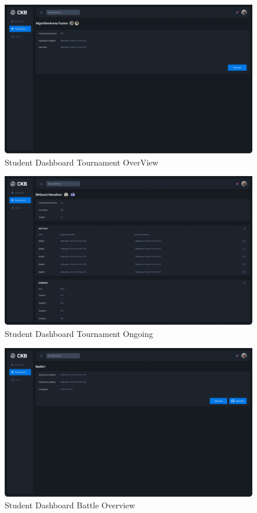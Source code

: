 \begin{figure}[H]
    \centering
    \includegraphics[width=\textwidth]{Images/Dashboard-Tournament-OverView.png}
    \caption{Student Dashboard Tournament OverView}
    \label{fig:student-Tournament-OverView}
\end{figure}

\begin{figure}[H]
    \centering
    \includegraphics[width=\textwidth]{Images/Dashboard-Tournament-Ongoing.png}
    \caption{Student Dashboard Tournament Ongoing}
    \label{fig:student-Tournament-Ongoing}
\end{figure}

\begin{figure}[H]
    \centering
    \includegraphics[width=\textwidth]{Images/Dashboard-Battle-Overview.png}
    \caption{Student Dashboard Battle Overview}
    \label{fig:student-Tournament-Completed}
\end{figure}

